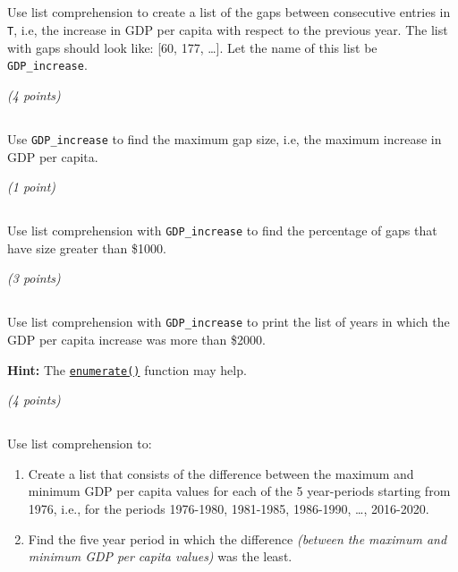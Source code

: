 \documentclass[
  letterpaper,
  DIV=11,
  numbers=noendperiod]{scrreprt}
\begin{document}
\hypertarget{section-18}{%
\subsection{}\label{section-18}}

Use list comprehension to create a list of the gaps between consecutive
entries in \texttt{T}, i.e, the increase in GDP per capita with respect
to the previous year. The list with gaps should look like: {[}60, 177,
\ldots{]}. Let the name of this list be \texttt{GDP\_increase}.

\emph{(4 points)}

\hypertarget{section-19}{%
\subsection{}\label{section-19}}

Use \texttt{GDP\_increase} to find the maximum gap size, i.e, the
maximum increase in GDP per capita.

\emph{(1 point)}

\hypertarget{section-20}{%
\subsection{}\label{section-20}}

Use list comprehension with \texttt{GDP\_increase} to find the
percentage of gaps that have size greater than \$1000.

\emph{(3 points)}

\hypertarget{section-21}{%
\subsection{}\label{section-21}}

Use list comprehension with \texttt{GDP\_increase} to print the list of
years in which the GDP per capita increase was more than \$2000.

\textbf{Hint:} The
\href{https://docs.python.org/3/library/functions.html\#enumerate}{\texttt{enumerate()}}
function may help.

\emph{(4 points)}

\hypertarget{section-22}{%
\subsection{}\label{section-22}}

Use list comprehension to:

\begin{enumerate}
\def\labelenumi{\arabic{enumi}.}
\item
  Create a list that consists of the difference between the maximum and
  minimum GDP per capita values for each of the 5 year-periods starting
  from 1976, i.e., for the periods 1976-1980, 1981-1985, 1986-1990,
  \ldots, 2016-2020.
\item
  Find the five year period in which the difference \emph{(between the
  maximum and minimum GDP per capita values)} was the least.
\end{enumerate}
\end{document}
